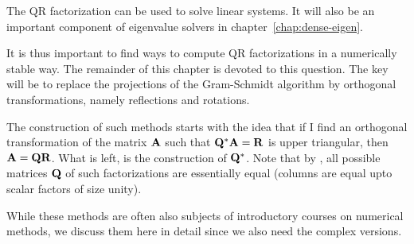 \begin{intro}
  The QR factorization can be used to solve linear systems. It will
  also be an important component of eigenvalue solvers in
  chapter~\ref{chap:dense-eigen}.

  It is thus important to find ways to compute QR factorizations in a
  numerically stable way. The remainder of this chapter is devoted to
  this question. The key will be to replace the projections of the
  Gram-Schmidt algorithm by orthogonal transformations, namely
  reflections and rotations.

  The construction of such methods starts with the idea that if I find
  an orthogonal transformation of the matrix $\mathbf A$ such that
  $\mathbf Q^*\mathbf A=\mathbf R$ is upper triangular, then
  $\mathbf A=\mathbf Q\mathbf R$. What is left, is the construction of
  $\mathbf Q^*$. Note that by , all
  possible matrices $\mathbf Q$ of such factorizations are essentially
  equal (columns are equal upto scalar factors of size unity).

  While these methods are often also subjects of introductory courses
  on numerical methods, we discuss them here in detail since we also
  need the complex versions.
\end{intro}

